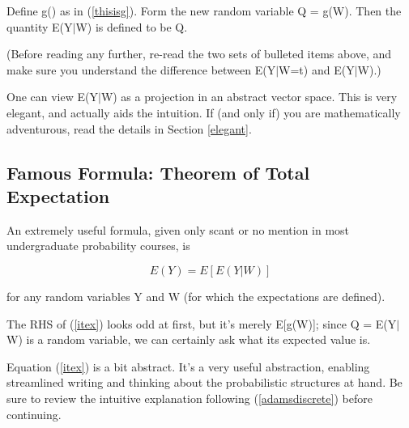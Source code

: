 \begin{definition}

Define g() as in (\ref{thisisg}).  Form the new random variable Q =
g(W).  Then the quantity E(Y$|$W) is defined to be Q. 

\end{definition}

(Before reading any further, re-read the two sets of bulleted items
above, and make sure you understand the difference between E(Y$|$W=t)
and E(Y$|$W).)

One can view E(Y$|$W) as a projection in an abstract vector space.  This
is very elegant, and actually aids the intuition.  If (and only if) you
are mathematically adventurous, read the details in Section
\ref{elegant}.

\subsection{Famous Formula: Theorem of Total Expectation}

An extremely useful formula, given only scant or no mention in
most undergraduate probability courses, is 

\begin{equation}
\label{itex}
E(Y)=E[E(Y|W)]
\end{equation}

for any random variables Y and W (for which the expectations are
defined).  

The RHS of (\ref{itex}) looks odd at first, but it's merely E[g(W)];
since Q =  E(Y$|$W) is a random variable, we can certainly ask what its
expected value is.

Equation (\ref{itex}) is a bit abstract.  It's a very useful
abstraction, enabling streamlined writing and thinking about the
probabilistic structures at hand.  Be sure to review the intuitive
explanation following (\ref{adamsdiscrete}) before continuing.

% 
% 
% 


